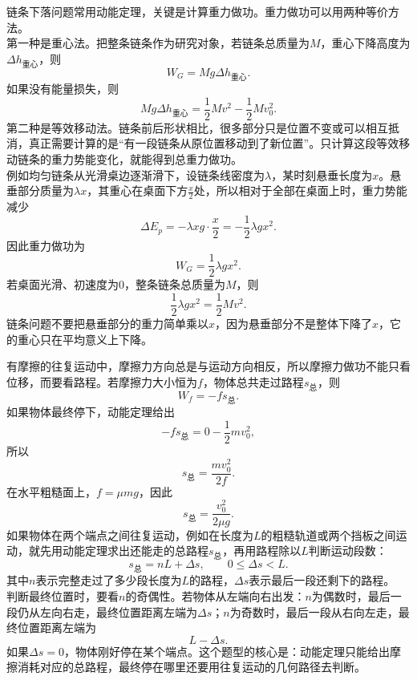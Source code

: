 \begin{casetypebox}[title={\strut\textcolor{white}{\bfseries 常见题型：链条下落问题}}]
  链条下落问题常用动能定理，关键是计算重力做功。重力做功可以用两种等价方法。\\
  第一种是重心法。把整条链条作为研究对象，若链条总质量为$M$，重心下降高度为$\Delta h_{\text{重心}}$，则
  \[
    W_G=Mg\Delta h_{\text{重心}}.
  \]
  如果没有能量损失，则
  \[
    Mg\Delta h_{\text{重心}}=\frac12Mv^2-\frac12Mv_0^2.
  \]
  第二种是等效移动法。链条前后形状相比，很多部分只是位置不变或可以相互抵消，真正需要计算的是“有一段链条从原位置移动到了新位置”。只计算这段等效移动链条的重力势能变化，就能得到总重力做功。\\
  例如均匀链条从光滑桌边逐渐滑下，设链条线密度为$\lambda$，某时刻悬垂长度为$x$。悬垂部分质量为$\lambda x$，其重心在桌面下方$\frac{x}{2}$处，所以相对于全部在桌面上时，重力势能减少
  \[
    \Delta E_p=-\lambda xg\cdot\frac{x}{2}
    =-\frac12\lambda gx^2.
  \]
  因此重力做功为
  \[
    W_G=\frac12\lambda gx^2.
  \]
  若桌面光滑、初速度为0，整条链条总质量为$M$，则
  \[
    \frac12\lambda gx^2=\frac12Mv^2.
  \]
  链条问题不要把悬垂部分的重力简单乘以$x$，因为悬垂部分不是整体下降了$x$，它的重心只在平均意义上下降。
\end{casetypebox}

\begin{casetypebox}[title={\strut\textcolor{white}{\bfseries 常见题型：摩擦做功与往复运动}}]
  有摩擦的往复运动中，摩擦力方向总是与运动方向相反，所以摩擦力做功不能只看位移，而要看路程。若摩擦力大小恒为$f$，物体总共走过路程$s_{\text{总}}$，则
  \[
    W_f=-fs_{\text{总}}.
  \]
  如果物体最终停下，动能定理给出
  \[
    -fs_{\text{总}}=0-\frac12mv_0^2,
  \]
  所以
  \[
    s_{\text{总}}=\frac{mv_0^2}{2f}.
  \]
  在水平粗糙面上，$f=\mu mg$，因此
  \[
    s_{\text{总}}=\frac{v_0^2}{2\mu g}.
  \]
  如果物体在两个端点之间往复运动，例如在长度为$L$的粗糙轨道或两个挡板之间运动，就先用动能定理求出还能走的总路程$s_{\text{总}}$，再用路程除以$L$判断运动段数：
  \[
    s_{\text{总}}=nL+\Delta s,\qquad 0\leq \Delta s<L.
  \]
  其中$n$表示完整走过了多少段长度为$L$的路程，$\Delta s$表示最后一段还剩下的路程。\\
  判断最终位置时，要看$n$的奇偶性。若物体从左端向右出发：$n$为偶数时，最后一段仍从左向右走，最终位置距离左端为$\Delta s$；$n$为奇数时，最后一段从右向左走，最终位置距离左端为
  \[
    L-\Delta s.
  \]
  如果$\Delta s=0$，物体刚好停在某个端点。这个题型的核心是：动能定理只能给出摩擦消耗对应的总路程，最终停在哪里还要用往复运动的几何路径去判断。
\end{casetypebox}
